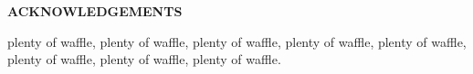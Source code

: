 \thispagestyle{plain}
\begin{center}
{\Large \bf \uppercase{Acknowledgements}}
\end{center}
plenty of waffle, plenty of waffle, plenty of waffle, plenty of waffle,
plenty of waffle, plenty of waffle, plenty of waffle, plenty of waffle.

